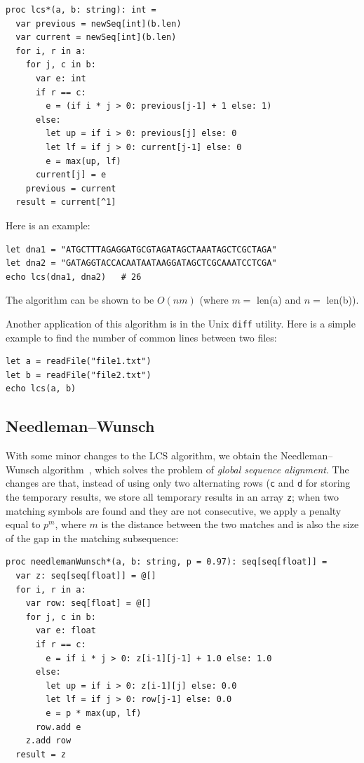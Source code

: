 \documentclass[justified, sixbynine]{tufte-book}
\def\ft{\small\tt}
\theoremstyle{plain}%
\newtheorem * {corollary}{Corollary}
\theoremstyle{definition}
\theoremstyle{remark}
\newtheorem * {remark}{Remark}
\newtheorem * {note}{Note}
\begin{document}
\begin{fullwidth}
\begin{lstlisting}[caption={in file: {\ft nlib/text.nim}}]
proc lcs*(a, b: string): int =
  var previous = newSeq[int](b.len)
  var current = newSeq[int](b.len)
  for i, r in a:
    for j, c in b:
      var e: int
      if r == c:
        e = (if i * j > 0: previous[j-1] + 1 else: 1)
      else:
        let up = if i > 0: previous[j] else: 0
        let lf = if j > 0: current[j-1] else: 0
        e = max(up, lf)
      current[j] = e
    previous = current
  result = current[^1]
\end{lstlisting}

Here is an example:

\begin{lstlisting}
let dna1 = "ATGCTTTAGAGGATGCGTAGATAGCTAAATAGCTCGCTAGA"
let dna2 = "GATAGGTACCACAATAATAAGGATAGCTCGCAAATCCTCGA"
echo lcs(dna1, dna2)   # 26
\end{lstlisting}

The algorithm can be shown to be $O(nm)$ (where $m=$ len(a) and $n=$ len(b)).

Another application of this algorithm is in the Unix {\ft diff} utility. Here is a simple example to find the number of common lines between two files:

\begin{lstlisting}
let a = readFile("file1.txt")
let b = readFile("file2.txt")
echo lcs(a, b)
\end{lstlisting}

\subsection{Needleman--Wunsch}


With some minor changes to the LCS algorithm, we obtain the Needleman--Wunsch algorithm~\cite{needleman}, which solves the problem of {\it global sequence alignment}. The changes are that, instead of using only two alternating rows ({\ft c} and {\ft d} for storing the temporary results, we store all temporary results in an array {\ft z}; when two matching symbols are found and they are not consecutive, we apply a penalty equal to $p^m$, where $m$ is the distance between the two matches and is also the size of the gap in the matching subsequence:

\begin{lstlisting}[caption={in file: {\ft nlib/text.nim}}]
proc needlemanWunsch*(a, b: string, p = 0.97): seq[seq[float]] =
  var z: seq[seq[float]] = @[]
  for i, r in a:
    var row: seq[float] = @[]
    for j, c in b:
      var e: float
      if r == c:
        e = if i * j > 0: z[i-1][j-1] + 1.0 else: 1.0
      else:
        let up = if i > 0: z[i-1][j] else: 0.0
        let lf = if j > 0: row[j-1] else: 0.0
        e = p * max(up, lf)
      row.add e
    z.add row
  result = z
\end{lstlisting}


\end{fullwidth}
\end{document}
